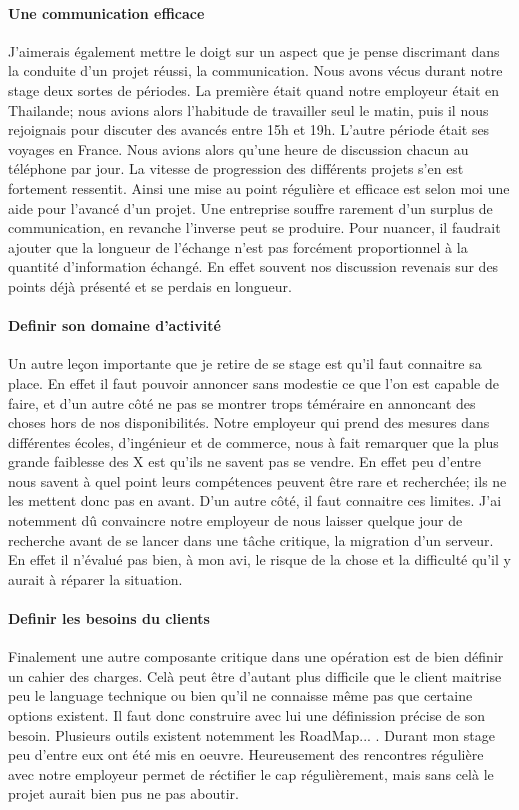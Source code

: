 \paragraph{Une communication efficace}
J'aimerais également mettre le doigt sur un aspect que je pense discrimant dans la conduite d'un projet réussi, la communication. Nous avons vécus durant notre stage deux sortes de périodes. La première était quand notre employeur était en Thailande; nous avions alors l'habitude de travailler seul le matin, puis il nous rejoignais pour discuter des avancés entre 15h et 19h. L'autre période était ses voyages en France. Nous avions alors qu'une heure de discussion chacun au téléphone par jour. La vitesse de progression des différents projets s'en est fortement ressentit. Ainsi une mise au point régulière et efficace est selon moi une aide pour l'avancé d'un projet. Une entreprise souffre rarement d'un surplus de communication, en revanche l'inverse peut se produire. Pour nuancer, il faudrait ajouter que la longueur de l'échange n'est pas forcément proportionnel à la quantité d'information échangé. En effet souvent nos discussion revenais sur des points déjà présenté et se perdais en longueur.

\paragraph{Definir son domaine d'activité}
Un autre leçon importante que je retire de se stage est qu'il faut connaitre sa place. En effet il faut pouvoir annoncer sans modestie ce que l'on est capable de faire, et d'un autre côté ne pas se montrer trops téméraire en annoncant des choses hors de nos disponibilités. Notre employeur qui prend des mesures dans différentes écoles, d'ingénieur et de commerce, nous à fait remarquer que la plus grande faiblesse des X est qu'ils ne savent pas se vendre. En effet peu d'entre nous savent à quel point leurs compétences peuvent être rare et recherchée; ils ne les mettent donc pas en avant. D'un autre côté, il faut connaitre ces limites. J'ai notemment dû convaincre notre employeur de nous laisser quelque jour de recherche avant de se lancer dans une tâche critique, la migration d'un serveur. En effet il n'évalué pas bien, à mon avi, le risque de la chose et la difficulté qu'il y aurait à réparer la situation.

\paragraph{Definir les besoins du clients}
Finalement une autre composante critique dans une opération est de bien définir un cahier des charges. Celà peut être d'autant plus difficile que le client maitrise peu le language technique ou bien qu'il ne connaisse même pas que certaine options existent. Il faut donc construire avec lui une définission précise de son besoin. Plusieurs outils existent notemment les RoadMap... . Durant mon stage peu d'entre eux ont été mis en oeuvre. Heureusement des rencontres régulière avec notre employeur permet de réctifier le cap régulièrement, mais sans celà le projet aurait bien pus ne pas aboutir.
